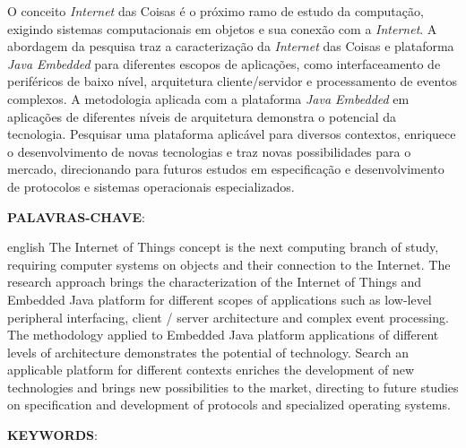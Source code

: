 \begin{resumo}
    
	O conceito \textit{Internet} das Coisas é o próximo ramo de estudo da computação, exigindo sistemas computacionais em objetos e sua conexão com a \textit{Internet}.
	A abordagem da pesquisa traz a caracterização da \textit{Internet} das Coisas e plataforma \textit{Java Embedded} para diferentes escopos de aplicações, como interfaceamento de periféricos de baixo nível, arquitetura cliente/servidor e processamento de eventos complexos.
	A metodologia aplicada com a plataforma \textit{Java Embedded} em aplicações de diferentes níveis de arquitetura demonstra o potencial da tecnologia.
	Pesquisar uma plataforma aplicável para diversos contextos, enriquece o desenvolvimento de novas tecnologias e traz novas possibilidades para o mercado, direcionando para futuros estudos em especificação e desenvolvimento de protocolos e sistemas operacionais especializados.
	
	\vspace{\onelineskip}
	\noindent
	\textbf{\uppercase{Palavras-chave}}: \palavraschave
    
\end{resumo}

\begin{resumo}[Abstract]
	\begin{otherlanguage*}{english}
		The Internet of Things concept is the next computing branch of study, requiring computer systems on objects and their connection to the Internet.
		The research approach brings the characterization of the Internet of Things and Embedded Java platform for different scopes of applications such as low-level peripheral interfacing, client / server architecture and complex event processing.
		The methodology applied to Embedded Java platform applications of different levels of architecture demonstrates the potential of technology.
		Search an applicable platform for different contexts enriches the development of new technologies and brings new possibilities to the market, directing to future studies on specification and development of protocols and specialized operating systems.
				
		\vspace{\onelineskip}
		\noindent
		\textbf{\uppercase{Keywords}}: \keywords
	\end{otherlanguage*}
\end{resumo}
